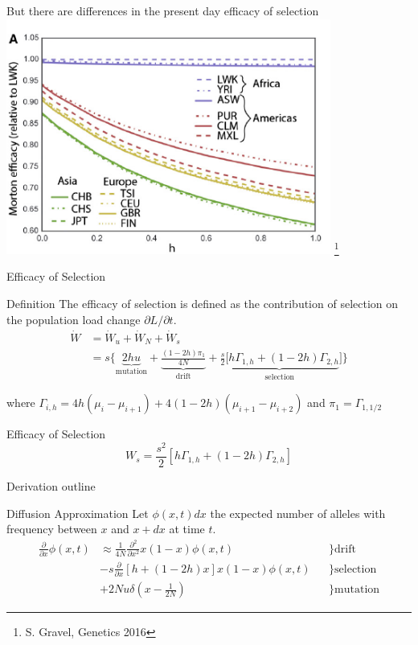 \documentclass[10pt]{beamer}
\newcommand{\del}[1]{\ensuremath{\frac{\partial}{\partial #1}}}
\newcommand{\dell}[1]{\ensuremath{\frac{\partial^2}{\partial #1^2}}}
\begin{document}
\begin{frame}{\normalsize But there are differences in the present day efficacy
    of selection} 
  \vfill
  \centering
  \includegraphics[width=0.8\textwidth]{./Figures/Gravel_efsel.png}
  \let\thefootnote\relax\footnote{S. Gravel, Genetics 2016}
\end{frame}

\begin{frame}{Efficacy of Selection}
  \begin{alertblock}{Definition}
    The efficacy of selection is defined as the contribution of selection on
    the population load change $\partial L / \partial t$.  
  \begin{align}
    \dot W &= \dot W_u + \dot W_N + \dot W_s
    \nonumber \\
    &= s \big\{
    \underbrace{2hu}_\text{mutation} + 
    \underbrace{\frac{(1 - 2h)\pi_1}{4N}}_\text{drift} + 
    \underbrace{\frac{s}{2}[h\Gamma_{1,h}+(1-2h)\Gamma_{2,h}}_\text{selection}]
      \big\}
  \end{align}
  \end{alertblock}
  where $\Gamma_{i,h} = 4h(\mu_i - \mu_{i + 1}) + 
  4(1 - 2h)(\mu_{i+1} - \mu_{i + 2})$ and $\pi_1=\Gamma_{1,1/2}$

  \begin{block}{Efficacy of Selection}
    \[
      W_s = \frac{s^2}{2}[h\Gamma_{1,h}+(1-2h)\Gamma_{2,h}]
    \] 
  \end{block}
\end{frame}

\begin{frame}{Derivation outline}
  \begin{block}{Diffusion Approximation}
    Let $\phi(x,t)dx$ the expected number of alleles with frequency between $x$
    and $x + dx$ at time $t$.
    \begin{align}
      \del x \phi(x,t) & \approx \frac{1}{4N} \dell x x(1-x) \phi(x,t) 
      & &\bigg\} \mathrm{drift}
      \nonumber \\ 
      &- s \del x [h + ( 1 - 2h)x]x(1-x) \phi(x,t) 
      & &\bigg\} \mathrm{selection}
      \nonumber \\
      &+ 2Nu\delta\left(x - \frac{1}{2N}\right)
      & &\bigg\} \mathrm{mutation}
    \end{align}
  \end{block}
\end{frame}
\end{document}
